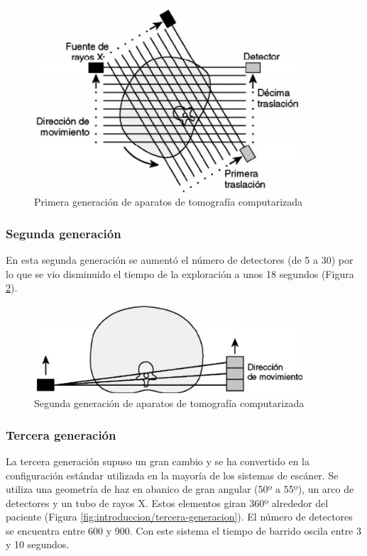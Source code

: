 \begin{figure}[H]
	\centering
	\includegraphics[width=10cm]{imagenes/introduccion/primera-generacion}
	\caption{Primera generación de aparatos de tomografía computarizada \cite{garcia14}}
	\label{fig:introduccion/primera-generacion}
\end{figure}

\subsubsection{Segunda generación}

En esta segunda generación se aumentó el número de detectores (de 5 a 30) por lo que se vio disminuido el tiempo de la exploración a unos 18 segundos (Figura \ref{fig:introduccion/segunda-generacion}).

\begin{figure}[H]
	\centering
	\includegraphics[width=10cm]{imagenes/introduccion/segunda-generacion}
	\caption{Segunda generación de aparatos de tomografía computarizada \cite{garcia14}}
	\label{fig:introduccion/segunda-generacion}
\end{figure}

\subsubsection{Tercera generación}

La tercera generación supuso un gran cambio y se ha convertido en la configuración estándar utilizada en la mayoría de los sistemas de escáner. Se utiliza una geometría de haz en abanico de gran angular (50º a 55º), un arco de detectores y un tubo de rayos X. Estos elementos giran 360º alrededor del paciente (Figura \ref{fig:introduccion/tercera-generacion}). El número de detectores se encuentra entre 600 y 900. Con este sistema el tiempo de barrido oscila entre 3 y 10 segundos.

